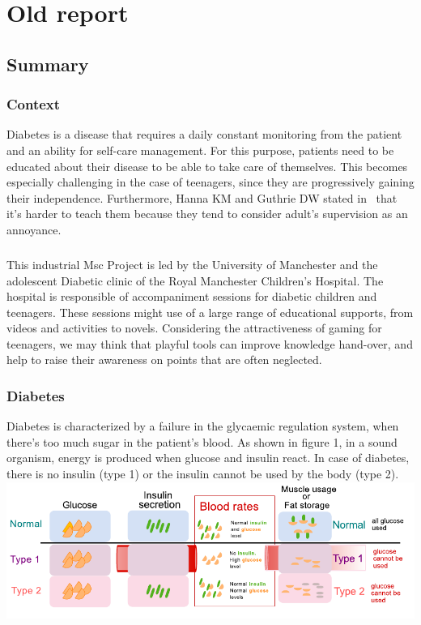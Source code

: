 \documentclass[12pt,MSc]{muthesis}
\begin{document}
\chapter{Old report}
\section{Summary}
\subsection{Context}
Diabetes is a disease that requires a daily constant monitoring from the patient and an ability for self-care management. For this purpose, patients need to be educated about their disease to be able to take care of themselves. This becomes especially challenging in the case of teenagers, since they are progressively gaining their independence. 
Furthermore, Hanna KM and Guthrie DW stated in~\cite{HannaKM} that it's harder to teach them because they tend to consider adult's supervision as an annoyance.
\paragraph{}
This industrial Msc Project is led by the University of Manchester and the adolescent Diabetic clinic of the Royal Manchester Children’s Hospital. The hospital is responsible of accompaniment sessions for diabetic children and teenagers. These sessions might use of a large range of educational supports, from videos and activities to novels. Considering the attractiveness of gaming for teenagers, we may think that playful tools can improve knowledge hand-over, and help to raise their awareness on points that are often neglected. 

\subsection{Diabetes}
Diabetes is characterized by a failure in the glycaemic regulation system, when there's too much sugar in the patient's blood. As shown in figure 1, in a sound organism, energy is produced when glucose and insulin react. In case of diabetes, there is no insulin (type 1) or the insulin cannot be used by the body (type 2).
\\
\includegraphics{diabetes_drawing}
\end{document}
